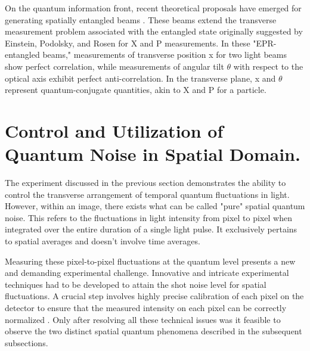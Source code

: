 \documentclass{article}
\begin{document}
On the quantum information front, recent theoretical proposals have emerged for generating spatially entangled beams \cite{Hsu_2005}. These beams extend the transverse measurement problem associated with the entangled state originally suggested by Einstein, Podolsky, and Rosen \cite{PhysRev.47.777} for X and P measurements. In these "EPR-entangled beams," measurements of transverse position x for two light beams show perfect correlation, while measurements of angular tilt $\theta$ with respect to the optical axis exhibit perfect anti-correlation. In the transverse plane, x and $\theta$ represent quantum-conjugate quantities, akin to X and P for a particle.

\section{Control and Utilization of Quantum Noise in Spatial Domain.}
The experiment discussed in the previous section demonstrates the ability to control the transverse arrangement of temporal quantum fluctuations in light. However, within an image, there exists what can be called "pure" spatial quantum noise. This refers to the fluctuations in light intensity from pixel to pixel when integrated over the entire duration of a single light pulse. It exclusively pertains to spatial averages and doesn't involve time averages.

Measuring these pixel-to-pixel fluctuations at the quantum level presents a new and demanding experimental challenge. Innovative and intricate experimental techniques had to be developed to attain the shot noise level for spatial fluctuations. A crucial step involves highly precise calibration of each pixel on the detector to ensure that the measured intensity on each pixel can be correctly normalized \cite{refId0}. Only after resolving all these technical issues was it feasible to observe the two distinct spatial quantum phenomena described in the subsequent subsections.
\end{document}
